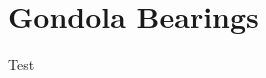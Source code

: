 \documentclass[../main.tex]{subfiles}
\begin{document}
\section{Gondola Bearings} \label{gondolaBearings}
Test
\end{document}
